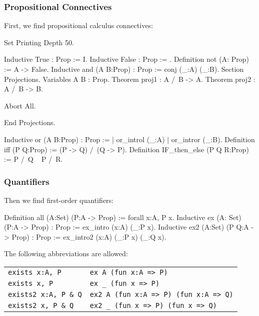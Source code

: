 \subsubsection[Propositional Connectives]{Propositional Connectives\label{Connectives}
}

First, we find propositional calculus connectives:

\begin{coq_eval}
Set Printing Depth 50.
\end{coq_eval}
\begin{coq_example*}
Inductive True : Prop := I.
Inductive False :  Prop := .
Definition not (A: Prop) := A -> False.
Inductive and (A B:Prop) : Prop := conj (_:A) (_:B).
Section Projections.
Variables A B : Prop.
Theorem proj1 : A /\ B -> A.
Theorem proj2 : A /\ B -> B.
\end{coq_example*}
\begin{coq_eval}
Abort All.
\end{coq_eval}
\begin{coq_example*}
End Projections.
\end{coq_example*}
\begin{coq_example*}
Inductive or (A B:Prop) : Prop :=
  | or_introl (_:A)
  | or_intror (_:B).
Definition iff (P Q:Prop) := (P -> Q) /\ (Q -> P).
Definition IF_then_else (P Q R:Prop) := P /\ Q \/ ~ P /\ R.
\end{coq_example*}

\subsubsection[Quantifiers]{Quantifiers\label{Quantifiers}
}

Then we find first-order quantifiers:

\begin{coq_example*}
Definition all (A:Set) (P:A -> Prop) := forall x:A, P x.
Inductive ex (A: Set) (P:A -> Prop) : Prop :=
    ex_intro (x:A) (_:P x).
Inductive ex2 (A:Set) (P Q:A -> Prop) : Prop :=
    ex_intro2 (x:A) (_:P x) (_:Q x).
\end{coq_example*}

The following abbreviations are allowed:
\begin{center}
  \begin{tabular}[h]{|l|l|}
    \hline
    \verb+exists x:A, P+     & \verb+ex A (fun x:A => P)+ \\
    \verb+exists x, P+       & \verb+ex _ (fun x => P)+ \\
    \verb+exists2 x:A, P & Q+ & \verb+ex2 A (fun x:A => P) (fun x:A => Q)+ \\
    \verb+exists2 x, P & Q+   & \verb+ex2 _ (fun x => P) (fun x => Q)+ \\
    \hline
  \end{tabular}
\end{center}


